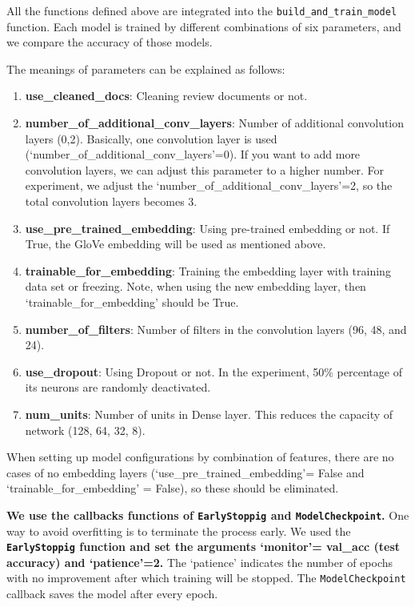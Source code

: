 \documentclass[11pt]{article}
\begin{document}
All the functions defined above are integrated into the \texttt{build\_and\_train\_model} function.
Each model is trained by different combinations of six parameters, and
we compare the accuracy of those models.

%
The meanings of parameters can be explained as follows:
\begin{enumerate}
\item \textbf{use\_cleaned\_docs}: Cleaning review documents or not. 
\item \textbf{number\_of\_additional\_conv\_layers}: Number of additional convolution layers (0,2). Basically, one convolution layer is used (`number\_of\_additional\_conv\_layers'=0). If you want to add more convolution layers, we can adjust this parameter to a higher number. For experiment, we adjust the `number\_of\_additional\_conv\_layers'=2, so the total convolution layers becomes 3.
\item \textbf{use\_pre\_trained\_embedding}: Using pre-trained embedding or not. If True, the GloVe embedding will be used as mentioned above.
\item \textbf{trainable\_for\_embedding}: Training the embedding layer with training data set or freezing. Note, when using the new embedding layer, then `trainable\_for\_embedding' should be True.
\item \textbf{number\_of\_filters}: Number of filters in the convolution layers (96, 48, and 24).
\item \textbf{use\_dropout}: Using Dropout or not. In the experiment, 50\% percentage of its neurons are randomly deactivated.
\item \textbf{num\_units}: Number of units in Dense layer. This reduces the capacity of network (128, 64, 32, 8). 
\end{enumerate}

When setting up model configurations by combination of features, there are no cases of no embedding layers 
(`use\_pre\_trained\_embedding'= False and `trainable\_for\_embedding' = False), so these should be eliminated.

\textbf{We use the callbacks functions of \texttt{EarlyStoppig} and \texttt{ModelCheckpoint}.}
%
One way to avoid overfitting is to terminate the process early.
We used the \textbf{\texttt{EarlyStoppig} function and set the arguments `monitor'= val\_acc (test accuracy) and `patience'=2.}
The `patience' indicates the number of epochs with no improvement after which training will be stopped.
%
The \texttt{ModelCheckpoint} callback saves the model after every epoch. 
\end{document}
